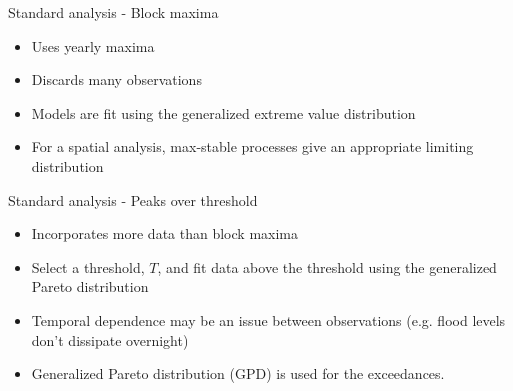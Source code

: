 \documentclass{beamer}
\begin{document}
\begin{frame}{Standard analysis - Block maxima}
  \begin{itemize} \setlength{\itemsep}{0.5em}
      \item Uses yearly maxima
      \item Discards many observations
      \item Models are fit using the generalized extreme value distribution
    \item For a spatial analysis, max-stable processes give an appropriate limiting distribution
  \end{itemize}
\end{frame}

\begin{frame}{Standard analysis - Peaks over threshold}
  \begin{itemize}
      \item Incorporates more data than block maxima
      \item Select a threshold, $T$, and fit data above the threshold using the generalized Pareto distribution
      \item Temporal dependence may be an issue between observations (e.g. flood levels don't dissipate overnight)
    \item Generalized Pareto distribution (GPD) is used for the exceedances.
  \end{itemize}
\end{frame}

\end{document}
